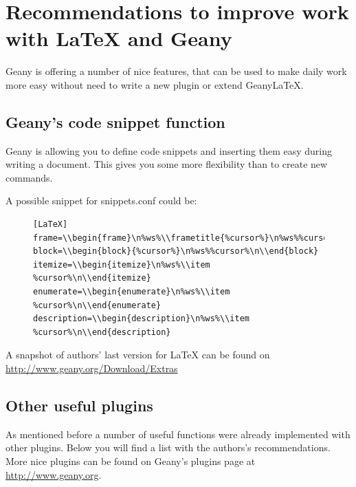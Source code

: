 \documentclass[%
a4paper,%
10pt,%
oneside,%
DIV18,
headsepline,
plainheadsepline,
footsepline,
plainfootsepline,
bibtotoc,%
liststotoc,%
BCOR12mm,%
halfparskip,%
openany,%
]{scrartcl}
\begin{document}
\newpage
\section{Recommendations to improve work with \LaTeX{} and Geany}
Geany is offering a number of nice features, that can be used to make
daily work more easy without need to write a new plugin or extend
Geany\LaTeX.

\subsection{Geany's code snippet function}
Geany is allowing you to define code snippets and inserting them easy
during writing a document. This gives you some more flexibility than to
create new commands.

A possible snippet for snippets.conf could be:

\begin{figure}[h!]
\begin{lstlisting}
[LaTeX]
frame=\\begin{frame}\n%ws%\\frametitle{%cursor%}\n%ws%%cursor%\n\\end{frame}
block=\\begin{block}{%cursor%}\n%ws%%cursor%\n\\end{block}
itemize=\\begin{itemize}\n%ws%\\item %cursor%\n\\end{itemize}
enumerate=\\begin{enumerate}\n%ws%\\item %cursor%\n\\end{enumerate}
description=\\begin{description}\n%ws%\\item %cursor%\n\\end{description}
\end{lstlisting}
\end{figure}

A snapshot of authors' last version for LaTeX can be found on
\url{http://www.geany.org/Download/Extras}

\subsection{Other useful plugins}
As mentioned before a number of useful functions were already
implemented with other plugins. Below you will find a list with the
authors's recommendations. More nice plugins can be found on Geany's
plugins page at \url{http://www.geany.org}.
\end{document}
